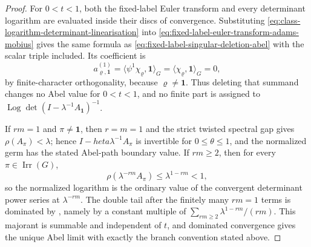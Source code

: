 \documentclass[11pt,a4paper]{amsart}
\theoremstyle{plain}
\theoremstyle{definition}
\theoremstyle{remark}
\DeclareMathOperator{\Irr}{Irr}
\DeclareMathOperator{\Log}{Log}
\begin{document}
\begin{proof}
  For \(0<t<1\), both the fixed-label Euler transform and every determinant
  logarithm are evaluated inside their discs of convergence. Substituting
  \eqref{eq:class-logarithm-determinant-linearisation} into
  \eqref{eq:fixed-label-euler-transform-adams-mobius} gives the same
  formula as \eqref{eq:fixed-label-singular-deletion-abel} with the scalar
  triple included.  Its coefficient is
  \[
    a_{\varrho,\mathbf1}^{(1)}
    =\langle\psi^1\chi_\varrho,\mathbf1\rangle_G
    =\langle\chi_\varrho,\mathbf1\rangle_G=0,
  \]
  by finite-character orthogonality, because \(\varrho\neq\mathbf1\).
  Thus deleting that summand changes no Abel value for \(0<t<1\), and no
  finite part is assigned to
  \(\Log\det(I-\lambda^{-1}A_{\mathbf1})^{-1}\).

  If \(rm=1\) and \(\pi\neq\mathbf1\), then \(r=m=1\) and the strict twisted
  spectral gap gives \(\rho(A_\pi)<\lambda\); hence
  \(I-	heta\lambda^{-1}A_\pi\) is invertible for \(0\le\theta\le1\), and
  the normalized germ has the stated Abel-path boundary value. If
  \(rm\ge2\), then for every \(\pi\in\Irr(G)\),
  \[
    \rho(\lambda^{-rm}A_\pi)
    \le \lambda^{1-rm}<1,
  \]
  so the normalized logarithm is the ordinary value of the convergent
  determinant power series at \(\lambda^{-rm}\).  The double tail after the
  finitely many \(rm=1\) terms is dominated by
  , namely by a constant
  multiple of \(\sum_{rm\ge2}\lambda^{1-rm}/(rm)\).  This majorant is
  summable and independent of \(t\), and dominated convergence gives the
  unique Abel limit with exactly the branch convention stated above.
\end{proof}
\end{document}
